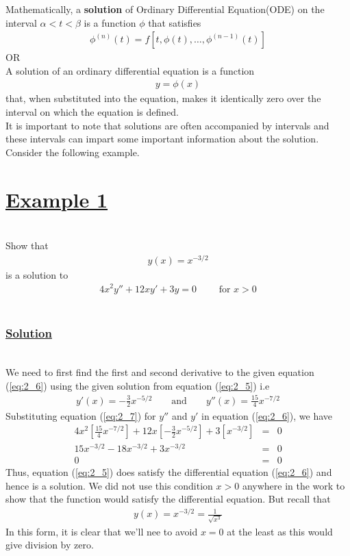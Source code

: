\documentclass[11pt]{report}
\newcommand{\ubt}[1]{\textbf{\underline{#1}}}
\newcommand{\sps}{\\[0.2cm]}
\newcommand{\spn}[1]{\\[#1cm]}
\newcommand{\refn}[1]{(\ref{#1})}
\newcommand{\refx}[1]{\refn{eq:#1}}
\newcommand{\bt}[1]{\textbf{#1}}
\newcommand{\NI}{\noindent}
\newcommand{\sprime}{'}
\newcommand{\dprime}{''}
\newcommand{\example}[1]{\section*{\ubt{Example #1}}{~}\spn{-1}}
\newcommand{\solution}{\subsubsection{\ubt{Solution}}{~}\spn{-1}}
\begin{document}
	\NI Mathematically, a \bt{solution} of Ordinary Differential Equation(ODE) on the interval $\alpha < t < \beta$ is a function $\phi$ that satisfies
	\begin{eqnarray}
		\phi^{(n)}(t) = f \left[t,\phi(t),\ldots,\phi^{(n-1)}(t)\right]\label{eq:2_3}
	\end{eqnarray}
	OR\sps
	A solution of an ordinary differential equation is a function 
	\begin{eqnarray}
		y = \phi(x)\label{eq:2_4}
	\end{eqnarray}
	that, when substituted into the equation, makes it identically zero over the interval on which the equation is defined.\sps
	It is important to note that solutions are often accompanied by intervals and these intervals can impart some important information about the solution. Consider the following example.\spn{-1.2}
	\newpage
	\example{1}
	Show that\spn{-1.3}
	\begin{eqnarray}
		y(x) = x^{-3/2}\label{eq:2_5}
	\end{eqnarray}
	 is a solution to\spn{-1.3}
	 \begin{eqnarray}
	 	4x^2 y\dprime + 12xy\sprime + 3y=0 \qquad\text{ for } x > 0\label{eq:2_6}
	 \end{eqnarray}
	{~}\spn{-1.6}
	\solution
	We need to first find the first and second derivative to the given equation \refx{2_6} using the given solution from equation \refx{2_5} i.e
	\begin{eqnarray}
		y\sprime(x) = -\frac{3}{2}x^{-5/2}\qquad \text{and} \qquad y\dprime(x) = \frac{15}{4}x^{-7/2}\label{eq:2_7}
	\end{eqnarray}
	Substituting equation \refx{2_7} for $y\dprime$ and $y\sprime$ in equation \refx{2_6}, we have
	\begin{eqnarray*}
		4x^2\left[\frac{15}{4}x^{-7/2}\right] + 12x\left[-\frac{3}{2}x^{-5/2}\right]+3\left[x^{-3/2}\right]&=&0\sps
		15x^{-3/2}-18x^{-3/2} + 3x^{-3/2} &=&0\sps
		0&=&0
	\end{eqnarray*}
	Thus, equation \refx{2_5} does satisfy the differential equation \refx{2_6} and hence is a solution. We did not use this condition $x > 0$ anywhere in the work  to show that the function would satisfy the differential equation. But recall that
	\begin{eqnarray*}
		y(x) = x^{-3/2} = \frac{1}{\sqrt{x^3}}
	\end{eqnarray*}
	In this form, it is clear that we'll nee to avoid $x=0$ at the least as this would give division by zero.
	
\end{document}
